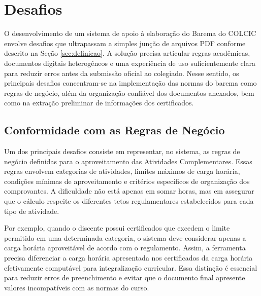 \section{Desafios}\label{sec:desafios}

O desenvolvimento de um sistema de apoio à elaboração do Barema do COLCIC envolve desafios que ultrapassam a simples junção de arquivos PDF conforme descrito na Seção \ref{sec:definicao}. A solução precisa articular regras acadêmicas, documentos digitais heterogêneos e uma experiência de uso suficientemente clara para reduzir erros antes da submissão oficial ao colegiado. Nesse sentido, os principais desafios concentram-se na implementação das normas do barema como regras de negócio, além da organização confiável dos documentos anexados, bem como na extração preliminar de informações dos certificados.

\subsection{Conformidade com as Regras de Negócio}

Um dos principais desafios consiste em representar, no sistema, as regras de negócio definidas para o aproveitamento das Atividades Complementares. Essas regras envolvem categorias de atividades, limites máximos de carga horária, condições mínimas de aproveitamento e critérios específicos de organização dos comprovantes. A dificuldade não está apenas em somar horas, mas em assegurar que o cálculo respeite os diferentes tetos regulamentares estabelecidos para cada tipo de atividade.

Por exemplo, quando o discente possui certificados que excedem o limite permitido em uma determinada categoria, o sistema deve considerar apenas a carga horária aproveitável de acordo com o regulamento. Assim, a ferramenta precisa diferenciar a carga horária apresentada nos certificados da carga horária efetivamente computável para integralização curricular. Essa distinção é essencial para reduzir erros de preenchimento e evitar que o documento final apresente valores incompatíveis com as normas do curso.


